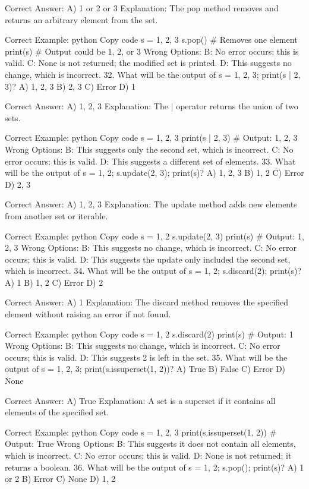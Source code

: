 Correct Answer: A) {1} or {2} or {3}
Explanation: The pop method removes and returns an arbitrary element from the set.

Correct Example:
python
Copy code
s = {1, 2, 3}
s.pop()  # Removes one element
print(s)  # Output could be {1}, {2}, or {3}
Wrong Options:
B: No error occurs; this is valid.
C: None is not returned; the modified set is printed.
D: This suggests no change, which is incorrect.
32. What will be the output of s = {1, 2, 3}; print(s | {2, 3})?
A) {1, 2, 3}
B) {2, 3}
C) Error
D) {1}

Correct Answer: A) {1, 2, 3}
Explanation: The | operator returns the union of two sets.

Correct Example:
python
Copy code
s = {1, 2, 3}
print(s | {2, 3})  # Output: {1, 2, 3}
Wrong Options:
B: This suggests only the second set, which is incorrect.
C: No error occurs; this is valid.
D: This suggests a different set of elements.
33. What will be the output of s = {1, 2}; s.update({2, 3}); print(s)?
A) {1, 2, 3}
B) {1, 2}
C) Error
D) {2, 3}

Correct Answer: A) {1, 2, 3}
Explanation: The update method adds new elements from another set or iterable.

Correct Example:
python
Copy code
s = {1, 2}
s.update({2, 3})
print(s)  # Output: {1, 2, 3}
Wrong Options:
B: This suggests no change, which is incorrect.
C: No error occurs; this is valid.
D: This suggests the update only included the second set, which is incorrect.
34. What will be the output of s = {1, 2}; s.discard(2); print(s)?
A) {1}
B) {1, 2}
C) Error
D) {2}

Correct Answer: A) {1}
Explanation: The discard method removes the specified element without raising an error if not found.

Correct Example:
python
Copy code
s = {1, 2}
s.discard(2)
print(s)  # Output: {1}
Wrong Options:
B: This suggests no change, which is incorrect.
C: No error occurs; this is valid.
D: This suggests 2 is left in the set.
35. What will be the output of s = {1, 2, 3}; print(s.issuperset({1, 2}))?
A) True
B) False
C) Error
D) None

Correct Answer: A) True
Explanation: A set is a superset if it contains all elements of the specified set.

Correct Example:
python
Copy code
s = {1, 2, 3}
print(s.issuperset({1, 2}))  # Output: True
Wrong Options:
B: This suggests it does not contain all elements, which is incorrect.
C: No error occurs; this is valid.
D: None is not returned; it returns a boolean.
36. What will be the output of s = {1, 2}; s.pop(); print(s)?
A) {1} or {2}
B) Error
C) None
D) {1, 2}

